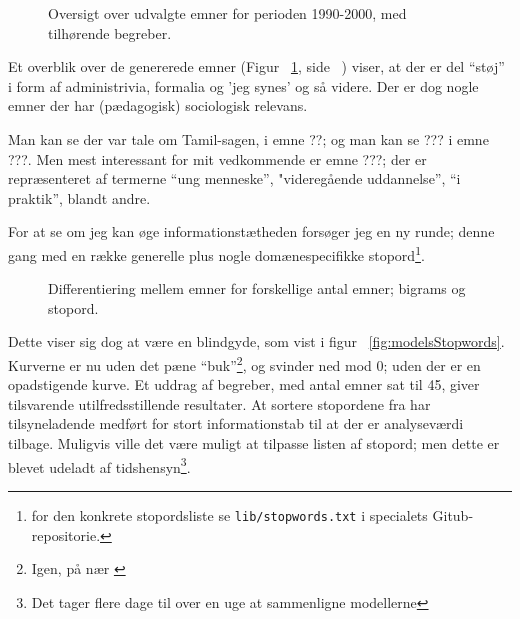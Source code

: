 \begin{figure}
\begin{adjustwidth}{-1in}{-1in}
  
\end{adjustwidth}
\caption{Oversigt over udvalgte emner for perioden 1990-2000, med tilhørende begreber.}
\label{fig:termsFull}
\end{figure}

Et overblik over de genererede emner (Figur ~\ref{fig:termsFull}, side ~\pageref{fig:termsFull}) viser, at der er del “støj” i form af administrivia, formalia og 'jeg synes' og så videre.
Der er dog nogle emner der har (pædagogisk) sociologisk relevans.

Man kan se der var tale om Tamil-sagen, i emne ??; og man kan se ??? i emne ???.
Men mest interessant for mit vedkommende er emne ???; der er repræsenteret af termerne “ung menneske”, "videregående uddannelse”, “i praktik”, blandt andre.

For at se om jeg kan øge informationstætheden forsøger jeg en ny runde; denne gang med en række generelle \autocite{stopwords-isoStopwordsISO2020} plus nogle domænespecifikke stopord\footnote{for den konkrete stopordsliste se \texttt{lib/stopwords.txt} i specialets Gitub-repositorie.}.

\begin{figure}

\caption{Differentiering mellem emner for forskellige antal emner; bigrams og stopord.}
\label{fig:models_stopwords}
\end{figure}

Dette viser sig dog at være en blindgyde, som vist i figur ~\ref{fig:modelsStopwords}.
Kurverne er nu uden det pæne “buk”\footnote{Igen, på nær \autocite{deveaudAccurateEffectiveLatent2014}}, og svinder ned mod 0; uden der er en opadstigende kurve.
Et uddrag af begreber, med antal emner sat til 45, giver tilsvarende utilfredsstillende resultater.
At sortere stopordene fra har tilsyneladende medført for stort informationstab til at der er analyseværdi tilbage.
Muligvis ville det være muligt at tilpasse listen af stopord; men dette er blevet udeladt af tidshensyn\footnote{Det tager flere dage til over en uge at sammenligne modellerne}.

